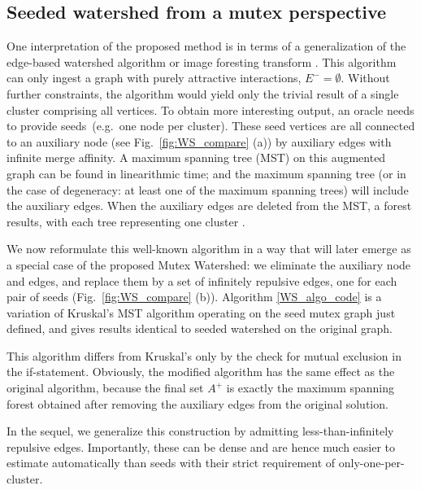 \subsection{Seeded watershed from a mutex perspective}
\noindent One interpretation of the proposed method is in terms of a generalization of the edge-based watershed algorithm \cite{Meyer1994,Meyer1994minimum,meyer1999morphological}
 or image foresting transform \cite{falcao2004image}.
This algorithm can only ingest a graph with purely attractive interactions, $E^{-} = \emptyset$. Without  further constraints, the algorithm would yield only the trivial result of a single cluster comprising all vertices. To obtain more interesting output, an oracle needs to provide seeds~(e.g.\ one node per cluster). These seed vertices are all connected to an auxiliary node (see Fig.~\ref{fig:WS_compare} (a)) by auxiliary edges with infinite merge affinity. A maximum spanning tree (MST) on this augmented graph can be found in linearithmic time; and the maximum spanning tree (or in the case of degeneracy: at least one of the maximum spanning trees) will include the auxiliary edges. When the auxiliary edges are deleted from the MST, a forest results, with each tree representing one cluster \cite{meyer1999morphological,Meyer1994,falcao2004image}.

We now reformulate this well-known algorithm in a way that will later emerge as a special case of the proposed Mutex Watershed: 
we eliminate the auxiliary node and edges, and replace them by a set of infinitely repulsive edges, one for each pair of seeds (Fig.~\ref{fig:WS_compare} (b)).
Algorithm \ref{WS_algo_code} is a variation of Kruskal's MST algorithm operating on the seed mutex graph just defined, and gives results identical to seeded watershed on the original graph. 


This algorithm differs from Kruskal's only by the check for mutual exclusion in the if-statement. Obviously, the modified algorithm has the same effect as the original algorithm, because the final set $A^+$ is exactly the maximum spanning forest obtained after removing the auxiliary edges from the original solution. 

In the sequel, we generalize this construction by admitting less-than-infinitely repulsive edges. Importantly, these can be dense and are hence much easier to estimate automatically than seeds with their strict requirement of only-one-per-cluster.


